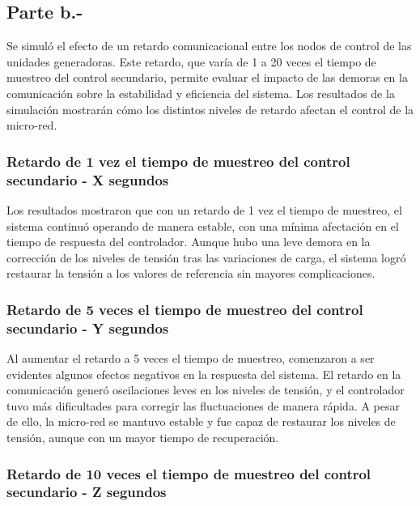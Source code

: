 \subsection{Parte b.-}

Se simuló el efecto de un retardo comunicacional entre los nodos de control de las unidades generadoras. Este retardo, que varía de 1 a 20 veces el tiempo de muestreo del control secundario, permite evaluar el impacto de las demoras en la comunicación sobre la estabilidad y eficiencia del sistema. Los resultados de la simulación mostrarán cómo los distintos niveles de retardo afectan el control de la micro-red.

\subsubsection{Retardo de 1 vez el tiempo de muestreo del control secundario - X segundos}


Los resultados mostraron que con un retardo de 1 vez el tiempo de muestreo, el sistema continuó operando de manera estable, con una mínima afectación en el tiempo de respuesta del controlador. Aunque hubo una leve demora en la corrección de los niveles de tensión tras las variaciones de carga, el sistema logró restaurar la tensión a los valores de referencia sin mayores complicaciones.

\subsubsection{Retardo de 5 veces el tiempo de muestreo del control secundario - Y segundos}


Al aumentar el retardo a 5 veces el tiempo de muestreo, comenzaron a ser evidentes algunos efectos negativos en la respuesta del sistema. El retardo en la comunicación generó oscilaciones leves en los niveles de tensión, y el controlador tuvo más dificultades para corregir las fluctuaciones de manera rápida. A pesar de ello, la micro-red se mantuvo estable y fue capaz de restaurar los niveles de tensión, aunque con un mayor tiempo de recuperación.

\subsubsection{Retardo de 10 veces el tiempo de muestreo del control secundario - Z segundos}

